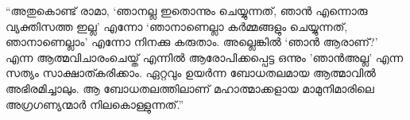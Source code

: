 “അതുകൊണ്ട് രാമാ, ‘ഞാനല്ല ഇതൊന്നും ചെയ്യുന്നത്, ഞാൻ എന്നൊരു വ്യക്തിസത്ത ഇല്ല’ എന്നോ ‘ഞാനാണെല്ലാ കർമ്മങ്ങളും ചെയ്യുന്നത്, ഞാനാണെല്ലാം’ എന്നോ നിനക്കു കരുതാം. അല്ലെങ്കിൽ ‘ഞാൻ ആരാണ്‌?’ എന്ന ആത്മവിചാരംചെയ്ത് എന്നിൽ ആരോപിക്കപ്പെട്ട ഒന്നും 'ഞാൻഅല്ല’ എന്ന സത്യം സാക്ഷാത്കരിക്കാം. ഏറ്റവും ഉയർന്ന ബോധതലമായ ആത്മാവിൽ അഭിരമിച്ചാലും. ആ ബോധതലത്തിലാണ്‌ മഹാത്മാക്കളായ മാമുനിമാരിലെ അഗ്രഗണ്യന്മാർ നിലകൊള്ളുന്നത്.” 
